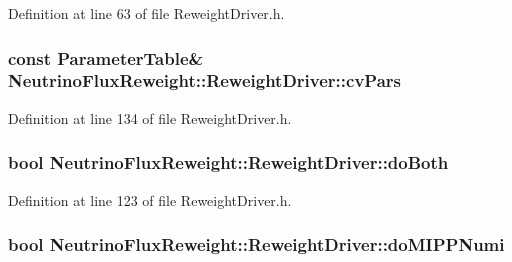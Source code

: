 Definition at line 63 of file Reweight\-Driver.\-h.

\hypertarget{class_neutrino_flux_reweight_1_1_reweight_driver_a93cb180e2036c14451c07e26efda51ea}{
\subsubsection[{cv\-Pars}]{\setlength{\rightskip}{0pt plus 5cm}const {\bf Parameter\-Table}\& Neutrino\-Flux\-Reweight\-::\-Reweight\-Driver\-::cv\-Pars\hspace{0.3cm}{\ttfamily [private]}}}\label{class_neutrino_flux_reweight_1_1_reweight_driver_a93cb180e2036c14451c07e26efda51ea}


Definition at line 134 of file Reweight\-Driver.\-h.

\hypertarget{class_neutrino_flux_reweight_1_1_reweight_driver_ae950950ece1bdb68ce6bf20713f98209}{
\subsubsection[{do\-Both}]{\setlength{\rightskip}{0pt plus 5cm}bool Neutrino\-Flux\-Reweight\-::\-Reweight\-Driver\-::do\-Both}}\label{class_neutrino_flux_reweight_1_1_reweight_driver_ae950950ece1bdb68ce6bf20713f98209}


Definition at line 123 of file Reweight\-Driver.\-h.

\hypertarget{class_neutrino_flux_reweight_1_1_reweight_driver_af4008e9db9a4dd5421e110e8281f5690}{
\subsubsection[{do\-M\-I\-P\-P\-Numi}]{\setlength{\rightskip}{0pt plus 5cm}bool Neutrino\-Flux\-Reweight\-::\-Reweight\-Driver\-::do\-M\-I\-P\-P\-Numi}}\label{class_neutrino_flux_reweight_1_1_reweight_driver_af4008e9db9a4dd5421e110e8281f5690}


